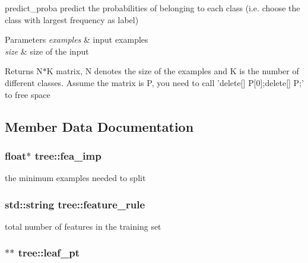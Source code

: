 predict\+\_\+proba predict the probabilities of belonging to each class (i.\+e. choose the class with largest frequency as label) 


\begin{DoxyParams}{Parameters}
{\em examples} & input examples \\
\hline
{\em size} & size of the input\\
\hline
\end{DoxyParams}
\begin{DoxyReturn}{Returns}
N$\ast$\+K matrix, N denotes the size of the examples and K is the number of different classes. Assume the matrix is P, you need to call 'delete\mbox{[}\mbox{]} P\mbox{[}0\mbox{]};delete\mbox{[}\mbox{]} P;' to free space 
\end{DoxyReturn}


\subsection{Member Data Documentation}
\hypertarget{classtree_ad335e57b2f4f2326825694311bcc69e7}{
\subsubsection[{fea\+\_\+imp}]{\setlength{\rightskip}{0pt plus 5cm}float$\ast$ tree\+::fea\+\_\+imp\hspace{0.3cm}{\ttfamily [protected]}}}\label{classtree_ad335e57b2f4f2326825694311bcc69e7}
the minimum examples needed to split \hypertarget{classtree_a5aba3b77a347165517a20d5fab94382d}{
\subsubsection[{feature\+\_\+rule}]{\setlength{\rightskip}{0pt plus 5cm}std\+::string tree\+::feature\+\_\+rule\hspace{0.3cm}{\ttfamily [protected]}}}\label{classtree_a5aba3b77a347165517a20d5fab94382d}
total number of features in the training set \hypertarget{classtree_ac697cf1868c26ac26f005e6ee8be9d43}{
\subsubsection[{leaf\+\_\+pt}]{$\ast$$\ast$ tree\+::leaf\+\_\+pt\hspace{0.3cm}{\ttfamily [protected]}}}\label{classtree_ac697cf1868c26ac26f005e6ee8be9d43}
